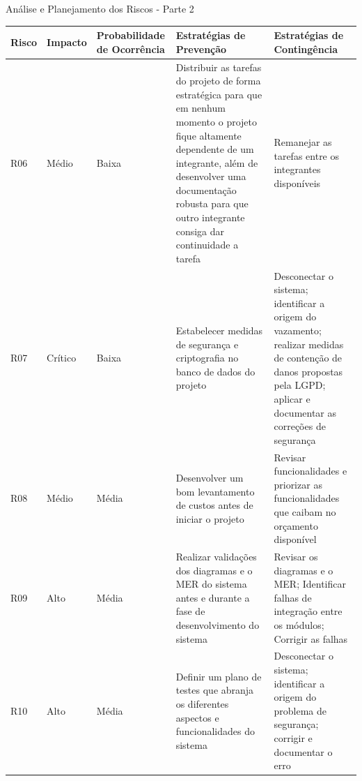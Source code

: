 \documentclass[
	12pt,				%
	openany,			%
	twoside,			%
	a4paper,			%
	english,			%
	french,				%
	spanish,			%
	brazil				%
	]{abntex2}
\begin{document}
 \begin{quadro}[H]
	\caption{Análise e Planejamento dos Riscos - Parte 2}
	\label{analise_riscos_2} 
	\begin{tabular} {|p{1cm}|p{1.6cm}|p{3cm}|p{4.7cm}|p{4.7cm}|}
		\hline
		\textbf{Risco} & \textbf{Impacto} & \textbf{Probabilidade de  Ocorrência} & \textbf{Estratégias de \newline Prevenção} & \textbf{Estratégias de \newline Contingência}\\
		\hline	
		R06 & Médio & Baixa & Distribuir as tarefas do projeto de forma estratégica  para que em nenhum momento o projeto fique altamente dependente de um integrante, além de desenvolver uma documentação robusta para que outro integrante consiga dar continuidade a tarefa & Remanejar as tarefas entre os integrantes disponíveis \\
		\hline
	 	R07 & Crítico & Baixa & Estabelecer medidas de segurança e criptografia no banco de dados do projeto & Desconectar o sistema; identificar a origem do vazamento; realizar medidas de contenção de danos propostas pela LGPD; aplicar e documentar as correções de segurança \\
	 	\hline
	 	R08 & Médio & Média & Desenvolver um bom levantamento de custos antes de iniciar o projeto & Revisar funcionalidades e priorizar as funcionalidades que caibam no orçamento disponível \\
	 	\hline
	 	R09 & Alto & Média & Realizar validações dos diagramas e o MER do sistema antes e durante a fase de desenvolvimento do sistema & Revisar os diagramas e o MER; Identificar falhas de integração entre os módulos; Corrigir as falhas \\
	 	\hline
	 	R10 & Alto & Média & Definir um plano de testes que abranja os diferentes aspectos e funcionalidades do sistema & Desconectar o sistema; identificar a origem do problema de segurança; corrigir e documentar o erro \\ \hline
 	\end{tabular}
\end{quadro}
\end{document}

